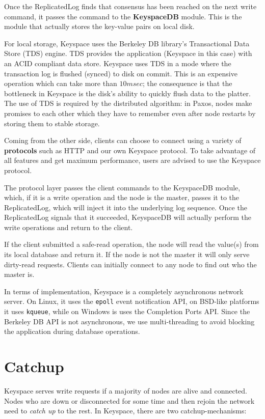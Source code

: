 \documentclass[12pt]{article}
\begin{document}
Once the ReplicatedLog finds that consensus has been reached on the next write command, it passes the command to the \textbf{KeyspaceDB} module. This is the module that actually stores the key-value pairs on local disk.

For local storage, Keyspace uses the Berkeley DB library's Transactional Data Store (TDS) engine. TDS provides the application (Keyspace in this case) with an ACID compliant data store. Keyspace uses TDS in a mode where the transaction log is flushed (synced) to disk on commit. This is an expensive operation which can take more than $10msec$; the consequence is that the bottleneck in Keyspace is the disk's ability to quickly flush data to the platter. The use of TDS is required by the distributed algorithm: in Paxos, nodes make promises to each other which they have to remember even after node restarts by storing them to stable storage.

Coming from the other side, clients can choose to connect using a variety of \textbf{protocols} such as HTTP and our own Keyspace protocol. To take advantage of all features and get maximum performance, users are advised to use the Keyspace protocol.

The protocol layer passes the client commands to the KeyspaceDB module, which, if it is a write operation and the node is the master, passes it to the ReplicatedLog, which will inject it into the underlying log sequence. Once the ReplicatedLog signals that it succeeded, KeyspaceDB will actually perform the write operations and return to the client.

If the client submitted a safe-read operation, the node will read the value(s) from its local database and return it. If the node is not the master it will only serve dirty-read requests. Clients can initially connect to any node to find out who the master is.

In terms of implementation, Keyspace is a completely asynchronous network server. On Linux, it uses the \texttt{epoll} event notification API, on BSD-like platforms it uses \texttt{kqueue}, while on Windows is uses the Completion Ports API. Since the Berkeley DB API is not asynchronous, we use multi-threading to avoid blocking the application during database operations.

\section{ Catchup }

Keyspace serves write requests if a majority of nodes are alive and connected. Nodes who are down or disconnected for some time and then rejoin the network need to \textit{catch up} to the rest. In Keyspace, there are two catchup-mechanisms:
\end{document}

